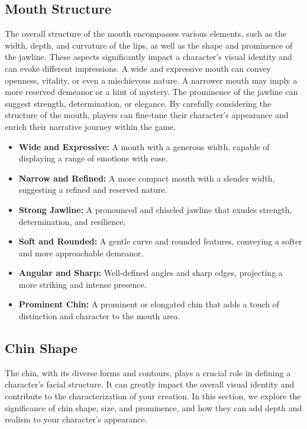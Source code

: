 \subsection{\textbf{Mouth Structure}}

The overall structure of the mouth encompasses various elements, such as the width, depth, and curvature of the lips, as well as the shape and prominence of the jawline. These aspects significantly impact a character's visual identity and can evoke different impressions. A wide and expressive mouth can convey openness, vitality, or even a mischievous nature. A narrower mouth may imply a more reserved demeanor or a hint of mystery. The prominence of the jawline can suggest strength, determination, or elegance. By carefully considering the structure of the mouth, players can fine-tune their character's appearance and enrich their narrative journey within the game.

\begin{itemize}
    \item \textbf{Wide and Expressive:} A mouth with a generous width, capable of displaying a range of emotions with ease.
    \item \textbf{Narrow and Refined:} A more compact mouth with a slender width, suggesting a refined and reserved nature.
    \item \textbf{Strong Jawline:} A pronounced and chiseled jawline that exudes strength, determination, and resilience.
    \item \textbf{Soft and Rounded:} A gentle curve and rounded features, conveying a softer and more approachable demeanor.
    \item \textbf{Angular and Sharp:} Well-defined angles and sharp edges, projecting a more striking and intense presence.
    \item \textbf{Prominent Chin:} A prominent or elongated chin that adds a touch of distinction and character to the mouth area.
\end{itemize}

\subsection{\textbf{Chin Shape}}

The chin, with its diverse forms and contours, plays a crucial role in defining a character's facial structure. It can greatly impact the overall visual identity and contribute to the characterization of your creation. In this section, we explore the significance of chin shape, size, and prominence, and how they can add depth and realism to your character's appearance.

